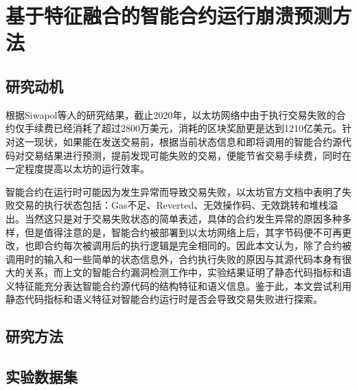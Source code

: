 \chapter{基于特征融合的智能合约运行崩溃预测方法}

\section{研究动机}
\label{sec:研究动机}
根据Siwapol等人的研究结果\cite{reducing2020}，截止2020年，以太坊网络中由于执行交易失败的合约仅手续费已经消耗了超过2800万美元，消耗的区块奖励更是达到1210亿美元。针对这一现状，如果能在发送交易前，根据当前状态信息和即将调用的智能合约源代码对交易结果进行预测，提前发现可能失败的交易，便能节省交易手续费，同时在一定程度提高以太坊的运行效率。

智能合约在运行时可能因为发生异常而导致交易失败，以太坊官方文档中表明了失败交易的执行状态包括：Gas不足、Reverted、无效操作码、无效跳转和堆栈溢出。当然这只是对于交易失败状态的简单表述，具体的合约发生异常的原因多种多样，但是值得注意的是，智能合约被部署到以太坊网络上后，其字节码便不可再更改，也即合约每次被调用后的执行逻辑是完全相同的。因此本文认为，除了合约被调用时的输入和一些简单的状态信息外，合约执行失败的原因与其源代码本身有很大的关系，而上文的智能合约漏洞检测工作中，实验结果证明了静态代码指标和语义特征能充分表达智能合约源代码的结构特征和语义信息。鉴于此，本文尝试利用静态代码指标和语义特征对智能合约运行时是否会导致交易失败进行探索。

\section{研究方法}
\label{sec:研究方法}
\section{实验数据集}
\label{sec:实验数据集}



